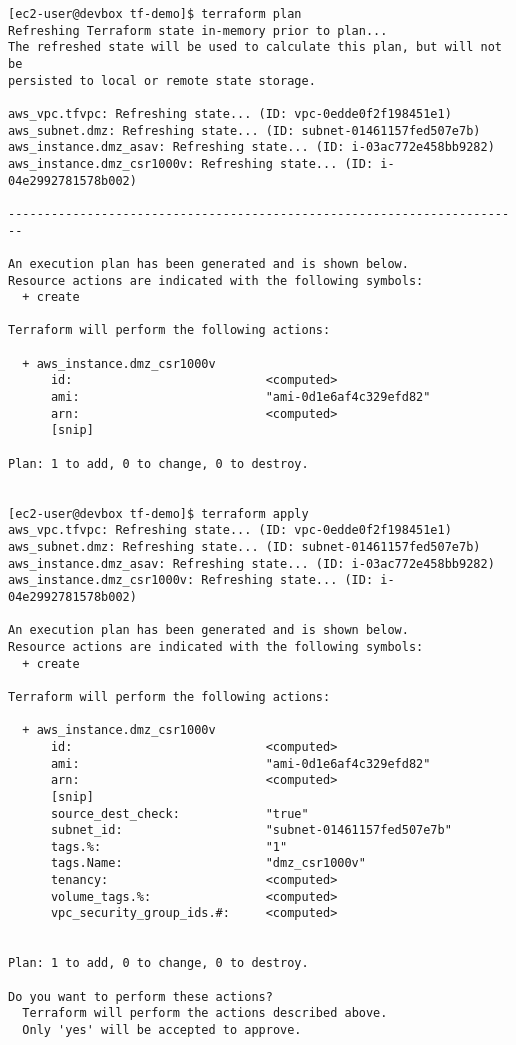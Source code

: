 \begin{verbatim}
[ec2-user@devbox tf-demo]$ terraform plan
Refreshing Terraform state in-memory prior to plan...
The refreshed state will be used to calculate this plan, but will not be
persisted to local or remote state storage.

aws_vpc.tfvpc: Refreshing state... (ID: vpc-0edde0f2f198451e1)
aws_subnet.dmz: Refreshing state... (ID: subnet-01461157fed507e7b)
aws_instance.dmz_asav: Refreshing state... (ID: i-03ac772e458bb9282)
aws_instance.dmz_csr1000v: Refreshing state... (ID: i-04e2992781578b002)

------------------------------------------------------------------------

An execution plan has been generated and is shown below.
Resource actions are indicated with the following symbols:
  + create

Terraform will perform the following actions:

  + aws_instance.dmz_csr1000v
      id:                           <computed>
      ami:                          "ami-0d1e6af4c329efd82"
      arn:                          <computed>
      [snip]

Plan: 1 to add, 0 to change, 0 to destroy.


[ec2-user@devbox tf-demo]$ terraform apply
aws_vpc.tfvpc: Refreshing state... (ID: vpc-0edde0f2f198451e1)
aws_subnet.dmz: Refreshing state... (ID: subnet-01461157fed507e7b)
aws_instance.dmz_asav: Refreshing state... (ID: i-03ac772e458bb9282)
aws_instance.dmz_csr1000v: Refreshing state... (ID: i-04e2992781578b002)

An execution plan has been generated and is shown below.
Resource actions are indicated with the following symbols:
  + create

Terraform will perform the following actions:

  + aws_instance.dmz_csr1000v
      id:                           <computed>
      ami:                          "ami-0d1e6af4c329efd82"
      arn:                          <computed>
      [snip]
      source_dest_check:            "true"
      subnet_id:                    "subnet-01461157fed507e7b"
      tags.%:                       "1"
      tags.Name:                    "dmz_csr1000v"
      tenancy:                      <computed>
      volume_tags.%:                <computed>
      vpc_security_group_ids.#:     <computed>


Plan: 1 to add, 0 to change, 0 to destroy.

Do you want to perform these actions?
  Terraform will perform the actions described above.
  Only 'yes' will be accepted to approve.


\end{verbatim}
